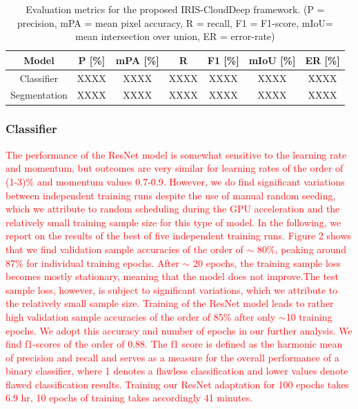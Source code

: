 \documentclass[amt, article]{copernicus}
\begin{document}
\begin{table}[t]
\begin{center}
    \caption{Evaluation metrics for the proposed IRIS-CloudDeep framework. (P = precision, mPA = mean pixel accuracy, R = recall, F1 = F1-score, mIoU= mean intersection over union, ER = error-rate)}
    \begin{tabular}{c c c c c c c} 
    \tophline \hline
     Model & P [\%] & mPA [\%] & R & F1 [\%] & mIoU [\%] & ER [\%] \\ [1.0ex]
     \hline
     Classifier & XXXX & XXXX & XXXX & XXXX & XXXX & XXXX \\ [1.0ex]
     Segmentation & XXXX & XXXX & XXXX & XXXX & XXXX & XXXX \\
     \hline
    \end{tabular}
    \belowtable{}
    \end{center}
\end{table}



\subsubsection{Classifier}

\textcolor{red}{The performance of the ResNet model is somewhat sensitive to the learning rate and momentum, but outcomes are very similar for learning rates of the order of (1-3)\% and momentum
values 0.7-0.9. However, we do find significant variations
between independent training runs despite the use of manual
random seeding, which we attribute to random scheduling
during the GPU acceleration and the relatively small training
sample size for this type of model. In the following, we report
on the results of the best of five independent training runs.
Figure 2 shows that we find validation sample accuracies of
the order of $\sim$ 80\%, peaking around 87\% for individual training epochs. After $\sim$ 20 epochs, the training sample loss becomes mostly stationary, meaning that the model does not improve.The test sample loss, however, is subject to significant
variations, which we attribute to the relatively small sample
size. Training of the ResNet model leads to rather high
validation sample accuracies of the order of 85\% after only
$\sim$10 training epochs. We adopt this accuracy and number of
epochs in our further analysis. We find f1-scores of the order of 0.88. The f1 score is defined as the harmonic mean of precision and recall and serves as a measure for the overall performance of a binary classifier, where 1 denotes a flawless classification and lower values denote flawed classification results. Training our ResNet adaptation for 100 epochs takes 6.9 hr, 10 epochs of training takes accordingly 41 minutes.}
\end{document}
